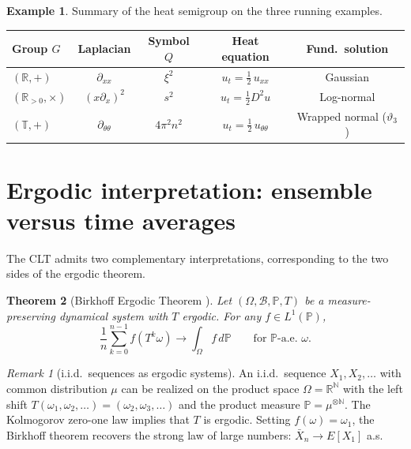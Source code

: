\documentclass[12pt]{amsart}
\newtheorem{theorem}{Theorem}[section]
\theoremstyle{definition}
\newtheorem{example}[theorem]{Example}
\theoremstyle{remark}
\newtheorem*{remark}{Remark}
\newcommand{\R}{\mathbb{R}}
\newcommand{\Rpos}{\mathbb{R}_{>0}}
\newcommand{\bT}{\mathbb{T}}
\begin{document}
\begin{example}\label{ex:heat-summary}
Summary of the heat semigroup on the three running examples.
\begin{center}
\renewcommand{\arraystretch}{1.4}
\footnotesize
\begin{tabular}{@{}lcccc@{}}
\textbf{Group $G$} & \textbf{Laplacian} & \textbf{Symbol $Q$} & \textbf{Heat equation} & \textbf{Fund.\ solution} \\
\hline
$(\R, +)$ & $\partial_{xx}$ & $\xi^2$ & $u_t = \tfrac{1}{2}\, u_{xx}$ & Gaussian \\
$(\Rpos, \times)$ & $(x\partial_x)^2$ & $s^2$ & $u_t = \tfrac{1}{2}D^2 u$ & Log-normal \\
$(\bT, +)$ & $\partial_{\theta\theta}$ & $4\pi^2 n^2$ & $u_t = \tfrac{1}{2}\, u_{\theta\theta}$ & Wrapped normal ($\vartheta_3$)
\end{tabular}
\normalsize
\end{center}
\end{example}

\section{Ergodic interpretation: ensemble versus time averages}

The CLT admits two complementary interpretations, corresponding to the two sides of the ergodic theorem.

\begin{theorem}[Birkhoff Ergodic Theorem {\cite[Theorem~6.2.1]{Durrett}}]\label{thm:birkhoff}
Let $(\Omega, \mathcal{B}, \mathbb{P}, T)$ be a measure-preserving dynamical system with $T$ ergodic. For any $f \in L^1(\mathbb{P})$,
\[
\frac{1}{n}\sum_{k=0}^{n-1} f(T^k \omega) \longrightarrow \int_\Omega f\, d\mathbb{P} \qquad \text{for $\mathbb{P}$-a.e.\ $\omega$}.
\]
\end{theorem}

\begin{remark}[i.i.d.\ sequences as ergodic systems]\label{rmk:iid-ergodic}
An i.i.d.\ sequence $X_1, X_2, \ldots$ with common distribution $\mu$ can be realized on the product space $\Omega = \R^{\mathbb{N}}$ with the left shift $T(\omega_1, \omega_2, \ldots) = (\omega_2, \omega_3, \ldots)$ and the product measure $\mathbb{P} = \mu^{\otimes \mathbb{N}}$. The Kolmogorov zero-one law implies that $T$ is ergodic. Setting $f(\omega) = \omega_1$, the Birkhoff theorem recovers the strong law of large numbers: $\bar{X}_n \to E[X_1]$ a.s.
\end{remark}
\end{document}
